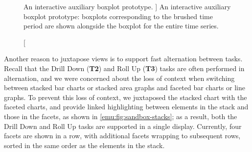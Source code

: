 
\begin{figure}
	\centering
	\caption
	[
	    An interactive auxiliary boxplot prototype.
	]
	{
	    An interactive auxiliary boxplot prototype: boxplots corresponding to the brushed time period are shown alongside the boxplot for the entire time series.
	}
	\centering
	\label{emu:fig:interactive-boxplots}
\end{figure}


 Another reason to juxtapose views is to support fast alternation between tasks.
Recall that the Drill Down ({\bf T2}) and Roll Up ({\bf T3}) tasks are often performed in alternation, and we were concerned about the loss of context when switching between stacked bar charts or stacked area graphs and faceted bar charts or line graphs.
To prevent this loss of context, we juxtaposed the stacked chart with the faceted charts, and provide linked highlighting between elements in the stack and those in the facets, as shown in \autoref{emu:fig:sandbox-stacks}; as a result, both the Drill Down and Roll Up tasks are supported in a single display.
Currently, four facets are shown in a row, with additional facets wrapping to subsequent rows, sorted in the same order as the elements in the stack.


